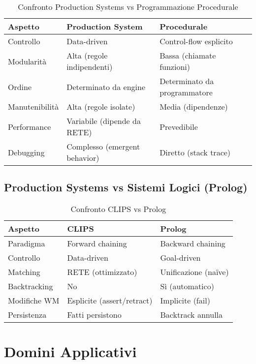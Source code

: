 \begin{table}[h]
\centering
\begin{tabular}{@{}lll@{}}
\toprule
\textbf{Aspetto} & \textbf{Production System} & \textbf{Procedurale} \\
\midrule
Controllo & Data-driven & Control-flow esplicito \\
Modularità & Alta (regole indipendenti) & Bassa (chiamate funzioni) \\
Ordine & Determinato da engine & Determinato da programmatore \\
Manutenibilità & Alta (regole isolate) & Media (dipendenze) \\
Performance & Variabile (dipende da RETE) & Prevedibile \\
Debugging & Complesso (emergent behavior) & Diretto (stack trace) \\
\bottomrule
\end{tabular}
\caption{Confronto Production Systems vs Programmazione Procedurale}
\label{tab:prod_vs_proc}
\end{table}

\subsection{Production Systems vs Sistemi Logici (Prolog)}

\begin{table}[h]
\centering
\begin{tabular}{@{}lll@{}}
\toprule
\textbf{Aspetto} & \textbf{CLIPS} & \textbf{Prolog} \\
\midrule
Paradigma & Forward chaining & Backward chaining \\
Controllo & Data-driven & Goal-driven \\
Matching & RETE (ottimizzato) & Unificazione (naïve) \\
Backtracking & No & Sì (automatico) \\
Modifiche WM & Esplicite (assert/retract) & Implicite (fail) \\
Persistenza & Fatti persistono & Backtrack annulla \\
\bottomrule
\end{tabular}
\caption{Confronto CLIPS vs Prolog}
\label{tab:clips_vs_prolog}
\end{table}

\section{Domini Applicativi}

